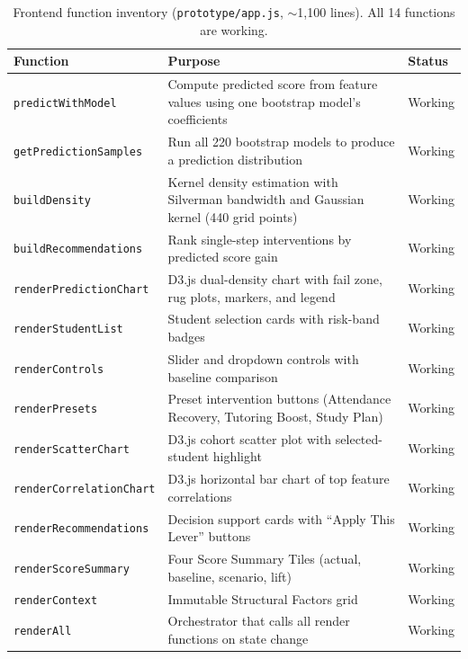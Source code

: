 \documentclass[11pt]{article}
\begin{document}
\begin{table}[t]
\centering
\small
\renewcommand{\arraystretch}{1.2}
\begin{tabular}{l p{8cm} l}
\toprule
\textbf{Function} & \textbf{Purpose} & \textbf{Status} \\
\midrule
\texttt{predictWithModel} & Compute predicted score from feature values using one bootstrap model's coefficients & Working \\
\texttt{getPredictionSamples} & Run all 220 bootstrap models to produce a prediction distribution & Working \\
\texttt{buildDensity} & Kernel density estimation with Silverman bandwidth and Gaussian kernel (440 grid points) & Working \\
\texttt{buildRecommendations} & Rank single-step interventions by predicted score gain & Working \\
\texttt{renderPredictionChart} & D3.js dual-density chart with fail zone, rug plots, markers, and legend & Working \\
\texttt{renderStudentList} & Student selection cards with risk-band badges & Working \\
\texttt{renderControls} & Slider and dropdown controls with baseline comparison & Working \\
\texttt{renderPresets} & Preset intervention buttons (Attendance Recovery, Tutoring Boost, Study Plan) & Working \\
\texttt{renderScatterChart} & D3.js cohort scatter plot with selected-student highlight & Working \\
\texttt{renderCorrelationChart} & D3.js horizontal bar chart of top feature correlations & Working \\
\texttt{renderRecommendations} & Decision support cards with ``Apply This Lever'' buttons & Working \\
\texttt{renderScoreSummary} & Four Score Summary Tiles (actual, baseline, scenario, lift) & Working \\
\texttt{renderContext} & Immutable Structural Factors grid & Working \\
\texttt{renderAll} & Orchestrator that calls all render functions on state change & Working \\
\bottomrule
\end{tabular}
\caption{Frontend function inventory (\texttt{prototype/app.js}, $\sim$1{,}100 lines). All 14 functions are working.}
\label{tab:frontend-functions}
\end{table}
\end{document}
